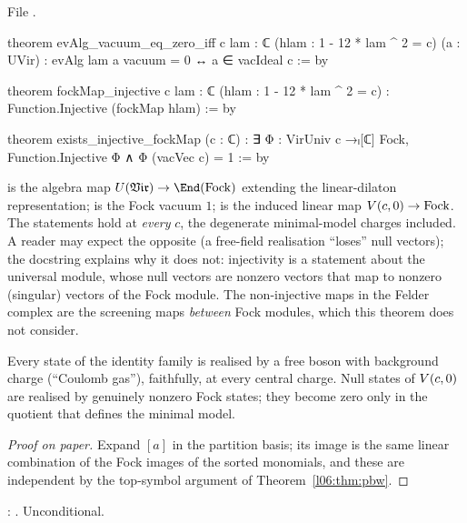 File .
\begin{leancode}
theorem evAlg_vacuum_eq_zero_iff {c lam : ℂ} (hlam : 1 - 12 * lam ^ 2 = c) (a : UVir) :
    evAlg lam a vacuum = 0 ↔ a ∈ vacIdeal c := by

theorem fockMap_injective {c lam : ℂ} (hlam : 1 - 12 * lam ^ 2 = c) :
    Function.Injective (fockMap hlam) := by

theorem exists_injective_fockMap (c : ℂ) :
    ∃ Φ : VirUniv c →ₗ[ℂ] Fock, Function.Injective Φ ∧ Φ (vacVec c) = 1 := by
\end{leancode}

\begin{dictionary}
 is the algebra map $\lsixU\to\End(\mathrm{Fock})$ extending the linear-dilaton
representation;  is the Fock vacuum $1$;  is the induced linear map
$V(c,0)\to\mathrm{Fock}$. The statements hold at \emph{every} $c$, the degenerate minimal-model charges
included. A reader may expect the opposite (a free-field realisation ``loses'' null vectors); the
docstring explains why it does not: injectivity is a statement about the universal module, whose null
vectors are nonzero vectors that map to nonzero (singular) vectors of the Fock module. The non-injective
maps in the Felder complex are the screening maps \emph{between} Fock modules, which this theorem does
not consider.
\end{dictionary}

\begin{physics}
Every state of the identity family is realised by a free boson with background charge (``Coulomb gas''),
faithfully, at every central charge. Null states of $V(c,0)$ are realised by genuinely nonzero Fock
states; they become zero only in the quotient that defines the minimal model.
\end{physics}

\begin{proof}[Proof on paper]
Expand $[a]$ in the partition basis; its image is the same linear combination of the Fock images of the
sorted monomials, and these are independent by the top-symbol argument of Theorem~\ref{l06:thm:pbw}.
\end{proof}

\begin{status}
\allowbreak{}\allowbreak{}\allowbreak{}: \lean{[propext, Classical.}\allowbreak{}\allowbreak\lean{sound]}. Unconditional.
\end{status}

